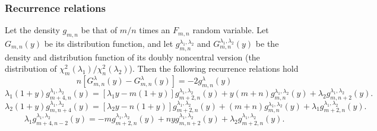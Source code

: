 \subsubsection{Recurrence relations}
\label{DoublyNonCentralF_Recursion}
Let the density $g_{m,n}$ be that of $m/n$ times an $F_{m,n}$ random variable. Let $G_{m,n}(y)$ be its distribution function, and let $g_{m,n}^{\lambda_1,\lambda_2}$ and $G_{m,n}^{\lambda_1,\lambda_2}(y)$ be the density and distribution function of its doubly noncentral version (the distribution of $\chi_m^2(\lambda_1)/\chi_n^2(\lambda_2)$). Then the following recurrence relations hold \citep{Chattamvelli_1995}
\begin{equation} \label{eq:DoublyNonCentralF_Recursion}
	n\left[G_{m,n}^{\lambda}(y)-G_{m,n}^{\lambda}(y)\right] =  -2g_{m,n}^{\lambda}(y)
\end{equation} 
\begin{equation} \label{eq:DoublyNonCentralF_Recursion_pdf_1}
	\lambda_1(1+y) g_{m+4,n}^{\lambda_1,\lambda_2}(y) = [\lambda_1 y - m(1+y)]g_{m+2,n}^{\lambda_1,\lambda_2}(y) + y(m+n)g_{m,n}^{\lambda_1,\lambda_2}(y) + \lambda_2 g_{m,n+2}^{\lambda_1,\lambda_2}(y).
\end{equation} 
\begin{equation} \label{eq:DoublyNonCentralF_Recursion_pdf_2}
	\lambda_2(1+y) g_{m,n+4}^{\lambda_1,\lambda_2}(y) =  [\lambda_2 y - n(1+y)]g_{m+2,n}^{\lambda_1,\lambda_2}(y) + (m+n)g_{m,n}^{\lambda_1,\lambda_2}(y) + \lambda_1 g_{m+2,n}^{\lambda_1,\lambda_2}(y).
\end{equation} 
\begin{equation} \label{eq:DoublyNonCentralF_Recursion_pdf_3}
	\lambda_1 g_{m+4,n-2}^{\lambda_1,\lambda_2}(y) = - m g_{m+2,n}^{\lambda_1,\lambda_2}(y) + n y g_{m,n+2}^{\lambda_1,\lambda_2}(y) + \lambda_2 g_{m+2,n}^{\lambda_1,\lambda_2}(y).
\end{equation} 




